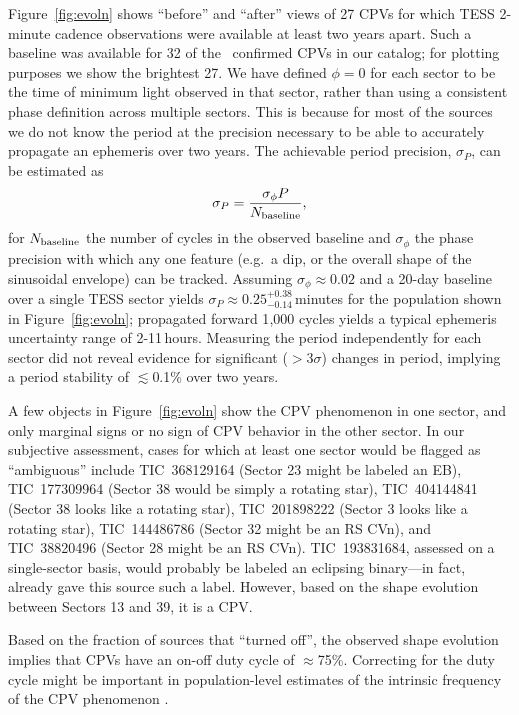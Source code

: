 \documentclass[11pt,twocolumn,tighten]{aastex63}
\begin{document}
Figure~\ref{fig:evoln} shows ``before'' and ``after'' views of 27 CPVs
for which TESS 2-minute cadence observations were available at least
two years apart.  Such a baseline was available for 32 of the \ngoods\
confirmed CPVs in our catalog; for plotting purposes we show the
brightest 27.  We have defined $\phi=0$ for each sector to be the time
of minimum light observed in that sector, rather than using a
consistent phase definition across multiple sectors.  This is because
for most of the sources we do not know the period at the precision
necessary to be able to accurately propagate an ephemeris over two
years.  The achievable period precision, $\sigma_P$, can be estimated
as
\begin{equation}
  \sigma_{P} = \frac { \sigma_{\phi} P } { N_{\rm baseline} },
  \label{eq:periodprecision}
\end{equation}
for $N_{\rm baseline}$ the number of cycles in the observed baseline
and $\sigma_{\phi}$ the phase precision with which any one feature
(e.g.~a dip, or the overall shape of the sinusoidal envelope) can be
tracked.  Assuming $\sigma_\phi$$\approx$$0.02$ and a 20-day baseline
over a single TESS sector yields
$\sigma_{P}$$\approx$$0.25^{+0.38}_{-0.14}$\,minutes for the
population shown in Figure~\ref{fig:evoln}; propagated forward 1{,}000
cycles yields a typical ephemeris uncertainty range of 2-11\,hours.
Measuring the period independently for each sector did not reveal
evidence for significant ($>$3$\sigma$) changes in period, implying a
period stability of $\lesssim$0.1\% over two years.

A few objects in Figure~\ref{fig:evoln} show the CPV phenomenon in one
sector, and only marginal signs or no sign of CPV behavior in the
other sector.  In our subjective assessment, cases for which at least
one sector would be flagged as ``ambiguous'' include
TIC~368129164 (Sector 23 might be labeled an EB),
TIC~177309964 (Sector 38 would be simply a rotating star),
TIC~404144841 (Sector 38 looks like a rotating star),
TIC~201898222 (Sector 3 looks like a rotating star),
TIC~144486786 (Sector 32 might be an RS CVn),
and
TIC~38820496 (Sector 28 might be an RS CVn).
TIC~193831684, assessed on a single-sector basis, would probably be
labeled an eclipsing binary---in fact, \citet{2021ApJ...912..123J}
already gave this source such a label.  However, based on the shape
evolution between Sectors 13 and 39, it is a CPV.

Based on the fraction of sources that ``turned off'', the
observed shape evolution implies that CPVs have an on-off duty cycle
of $\approx$75\%.  Correcting for the duty cycle might be important in
population-level estimates of the intrinsic frequency of the CPV
phenomenon \citep[e.g.][]{2022AJ....163..144G}.
\end{document}
